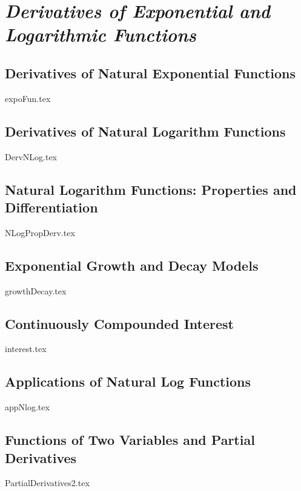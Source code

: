 \documentclass[11pt,a4paper,oneside]{book}
\theoremstyle{definition}%
\begin{document}
\part{\emph{Derivatives of Exponential and Logarithmic Functions}}

\chapter{Derivatives of Natural Exponential Functions}\label{expoFun}
{expoFun.tex}

\chapter{Derivatives of Natural Logarithm Functions}\label{DervNLog}
{DervNLog.tex}

\chapter{Natural Logarithm Functions: Properties and Differentiation}\label{NLogPropDerv}
{NLogPropDerv.tex}

\chapter{Exponential Growth and Decay Models}\label{growthDecay}
{growthDecay.tex}

\chapter{Continuously Compounded Interest}\label{interest}
{interest.tex}

\chapter{Applications of Natural Log Functions}\label{appNlog}
{appNlog.tex}

\chapter{Functions of Two Variables and Partial Derivatives}\label{PartialDerivatives}
{PartialDerivatives2.tex}



\end{document}
